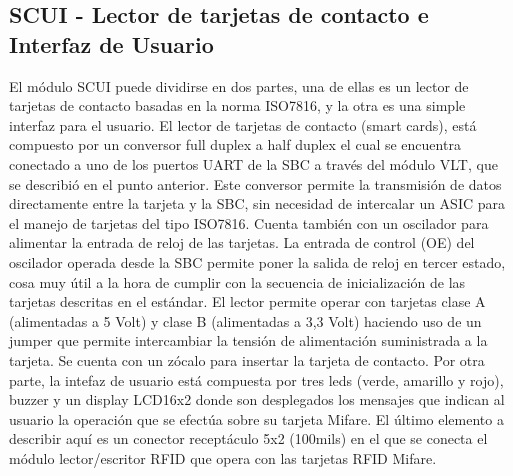 \subsection{SCUI - Lector de tarjetas de contacto e Interfaz de Usuario}
El módulo SCUI puede dividirse en dos partes, una de ellas es un lector de tarjetas de contacto basadas en la norma ISO7816, y la otra es una simple interfaz para el usuario.
El lector de tarjetas de contacto (smart cards), está compuesto por un conversor full duplex a half duplex el cual se encuentra conectado a uno de los puertos UART de la SBC a través del módulo VLT, que se describió en el punto anterior. Este conversor permite la transmisión de datos directamente entre la tarjeta y la SBC, sin necesidad de intercalar un ASIC para el manejo de tarjetas del tipo ISO7816. Cuenta también con un oscilador para alimentar la entrada de reloj de las tarjetas. La entrada de control (OE) del oscilador operada desde la SBC permite poner la salida de reloj en tercer estado, cosa muy útil a la hora de cumplir con la secuencia de inicialización de las tarjetas descritas en el estándar. El lector permite operar con tarjetas clase A (alimentadas a 5 Volt) y clase B (alimentadas a 3,3 Volt) haciendo uso de un jumper que permite intercambiar la tensión de alimentación suministrada a la tarjeta. Se cuenta con un zócalo para insertar la tarjeta de contacto.
Por otra parte, la intefaz de usuario está compuesta por tres leds (verde, amarillo y rojo), buzzer y un display LCD16x2 donde son desplegados los mensajes que indican al usuario la operación que se efectúa sobre su tarjeta Mifare.
El último elemento a describir aquí es un conector receptáculo 5x2 (100mils) en el que se conecta el módulo lector/escritor RFID que opera con las tarjetas RFID Mifare.

